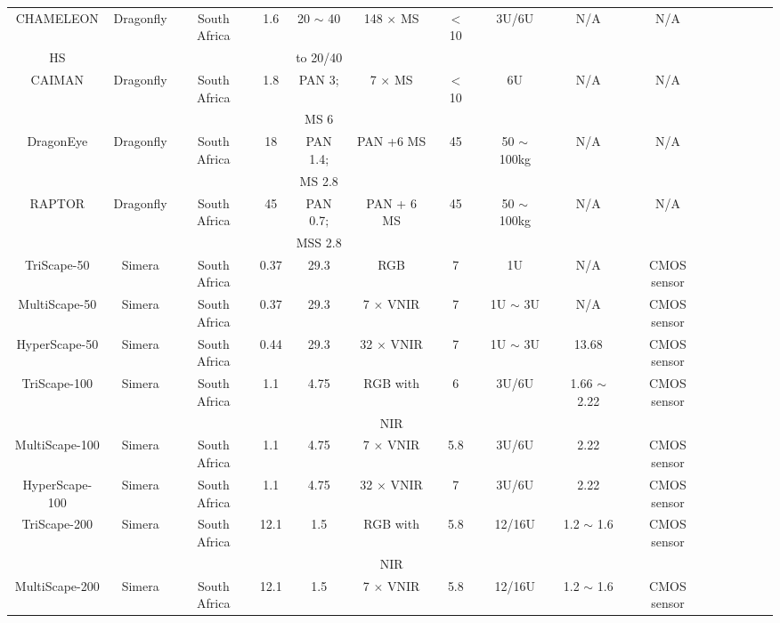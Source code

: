 \documentclass[final,5p,times,twocolumn]{elsarticle}
\begin{document}
\begin{table}
{\begin{tabular}{c c c c c c c c c c c c c c c}
			CHAMELEON & Dragonfly & South Africa & 1.6 & 20 $\sim$ 40 &  148 $\times$ MS & $<$ 10 &  3U/6U & N/A & N/A & \citep{dragonfly2023} \\
			HS& & & & to 20/40 &  & & & & & & & & & \\
			CAIMAN &  Dragonfly & South Africa & 1.8 & PAN 3; &  7 $\times$ MS & $<$ 10 &  6U & N/A & N/A & \citep{dragonfly2023} \\
			& & & & MS 6 &  & & & & & & & & & \\
			DragonEye & Dragonfly & South Africa & 18 & PAN 1.4; &  PAN +6 MS & 45 & 50 $\sim$ 100kg & N/A & N/A & \citep{dragonfly2023}\\
			& & & & MS 2.8 &  & & & & & & & & & \\
			RAPTOR & Dragonfly & South Africa & 45 & PAN 0.7; &  PAN + 6 MS & 45 &  50 $\sim$ 100kg & N/A & N/A & \citep{dragonfly2023} \\
			& & & & MSS 2.8 &  & & & & & & & & & \\
			TriScape-50 & Simera & South Africa & 0.37 & 29.3 & RGB & 7 & 1U & N/A & CMOS   sensor &\citep{casini2020towards, simer2023}\\
			MultiScape-50 & Simera & South Africa & 0.37 & 29.3 &  7 $\times$ VNIR & 7 & 1U $\sim$ 3U & N/A & CMOS sensor & \citep{casini2020towards, simer2023}\\
			HyperScape-50 & Simera & South Africa & 0.44 & 29.3 & 32 $\times$ VNIR & 7 &  1U $\sim$ 3U & 13.68 & CMOS sensor & \citep{casini2020towards, Simera2023}\\
			TriScape-100 & Simera & South Africa & 1.1 & 4.75 &  RGB with & 6 &  3U/6U & 1.66 $\sim$ 2.22 & CMOS  sensor & \citep{casini2020towards, Simera2023}\\
			& & & & &  NIR & & & & & & &  \\
			MultiScape-100 & Simera & South Africa & 1.1 & 4.75 & 7 $\times$ VNIR & 5.8 &  3U/6U & 2.22 & CMOS  sensor  & \citep{casini2020towards,  Simera2023}\\
			HyperScape-100 & Simera & South Africa & 1.1 & 4.75 &  32 $\times$ VNIR & 7 &  3U/6U & 2.22 & CMOS sensor & \citep{casini2020towards, Simera2023}\\
			TriScape-200 & Simera & South Africa & 12.1 & 1.5 & RGB with & 5.8 &12/16U & 1.2 $\sim$ 1.6 & CMOS sensor & \citep{Simera2023}\\
			& & & & &  NIR & & & & & & &  \\
			MultiScape-200 & Simera & South Africa & 12.1 & 1.5 & 7 $\times$ VNIR & 5.8 &  12/16U & 1.2 $\sim$ 1.6 & CMOS sensor  & \citep{Simera2023} \\

\end{tabular}}
\end{table}
\end{document}
